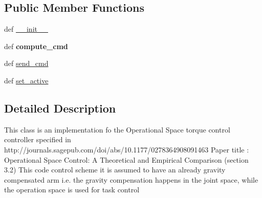 \subsection*{Public Member Functions}
\begin{DoxyCompactItemize}
\item 
def \hyperlink{classaml__ctrl_1_1controllers_1_1os__controllers_1_1os__torque__controller_1_1_o_s_torque_controller_ac1608a2c52270e0612e0c86bf7d1c205}{\-\_\-\-\_\-init\-\_\-\-\_\-}
\item 
\hypertarget{classaml__ctrl_1_1controllers_1_1os__controllers_1_1os__torque__controller_1_1_o_s_torque_controller_ade8dd018b7bb2e5106b154b36948d8d1}{def {\bfseries compute\-\_\-cmd}}\label{classaml__ctrl_1_1controllers_1_1os__controllers_1_1os__torque__controller_1_1_o_s_torque_controller_ade8dd018b7bb2e5106b154b36948d8d1}

\item 
def \hyperlink{classaml__ctrl_1_1controllers_1_1os__controllers_1_1os__torque__controller_1_1_o_s_torque_controller_a31d3e8ae8563a5f31b173d87eafaa996}{send\-\_\-cmd}
\item 
def \hyperlink{classaml__ctrl_1_1controllers_1_1os__controllers_1_1os__torque__controller_1_1_o_s_torque_controller_a73b83e3fd7cfaead53fa8287766f7d61}{set\-\_\-active}
\end{DoxyCompactItemize}


\subsection{Detailed Description}
\begin{DoxyVerb}This class is an implementation fo the Operational Space torque control
controller specified in http://journals.sagepub.com/doi/abs/10.1177/0278364908091463
Paper title : Operational Space Control: A Theoretical and Empirical Comparison (section 3.2)
This code control scheme it is assumed to have an already gravity compensated arm
i.e. the gravity compensation happens in the joint space, while the operation space is used for task control
\end{DoxyVerb}
 

